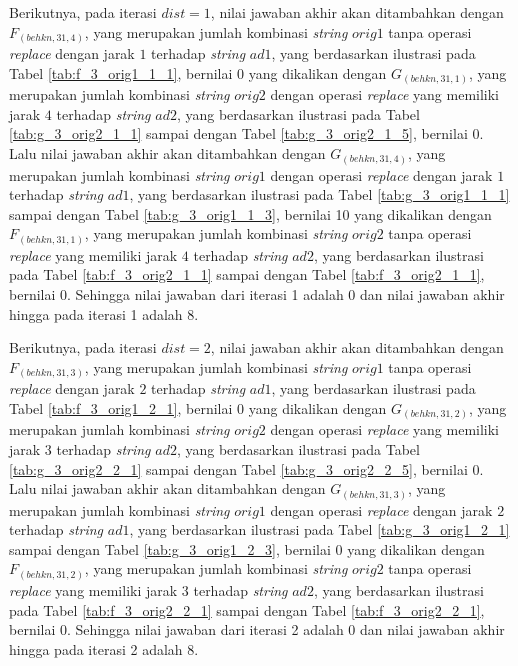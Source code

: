 Berikutnya, pada iterasi $ dist = 1 $, nilai jawaban akhir akan ditambahkan dengan $ F_{(behkn, 31,4)} $, yang merupakan jumlah kombinasi \textit{string} $ orig1 $ tanpa operasi \textit{replace} dengan jarak $ 1 $ terhadap \textit{string} $ ad1 $, yang berdasarkan ilustrasi pada Tabel \ref{tab:f_3_orig1_1_1}, bernilai 0 yang dikalikan dengan $ G_{(behkn, 31,1)} $, yang merupakan jumlah kombinasi \textit{string} $ orig2 $ dengan operasi \textit{replace} yang memiliki jarak $ 4 $ terhadap \textit{string} $ ad2 $, yang berdasarkan ilustrasi pada Tabel \ref{tab:g_3_orig2_1_1} sampai dengan Tabel \ref{tab:g_3_orig2_1_5}, bernilai 0. Lalu nilai jawaban akhir akan ditambahkan dengan $ G_{(behkn, 31,4)} $, yang merupakan jumlah kombinasi \textit{string} $ orig1 $ dengan operasi \textit{replace} dengan jarak $ 1 $ terhadap \textit{string} $ ad1 $, yang berdasarkan ilustrasi pada Tabel \ref{tab:g_3_orig1_1_1} sampai dengan Tabel \ref{tab:g_3_orig1_1_3}, bernilai 10 yang dikalikan dengan $ F_{(behkn, 31,1)} $, yang merupakan jumlah kombinasi \textit{string} $ orig2 $ tanpa operasi \textit{replace} yang memiliki jarak $ 4 $ terhadap \textit{string} $ ad2 $, yang berdasarkan ilustrasi pada Tabel \ref{tab:f_3_orig2_1_1} sampai dengan Tabel \ref{tab:f_3_orig2_1_1}, bernilai 0. Sehingga nilai jawaban dari iterasi 1 adalah 0 dan nilai jawaban akhir hingga pada iterasi 1 adalah 8.

Berikutnya, pada iterasi $ dist = 2 $, nilai jawaban akhir akan ditambahkan dengan $ F_{(behkn, 31,3)} $, yang merupakan jumlah kombinasi \textit{string} $ orig1 $ tanpa operasi \textit{replace} dengan jarak $ 2 $ terhadap \textit{string} $ ad1 $, yang berdasarkan ilustrasi pada Tabel \ref{tab:f_3_orig1_2_1}, bernilai 0 yang dikalikan dengan $ G_{(behkn, 31,2)} $, yang merupakan jumlah kombinasi \textit{string} $ orig2 $ dengan operasi \textit{replace} yang memiliki jarak $ 3 $ terhadap \textit{string} $ ad2 $, yang berdasarkan ilustrasi pada Tabel \ref{tab:g_3_orig2_2_1} sampai dengan Tabel \ref{tab:g_3_orig2_2_5}, bernilai 0. Lalu nilai jawaban akhir akan ditambahkan dengan $ G_{(behkn, 31,3)} $, yang merupakan jumlah kombinasi \textit{string} $ orig1 $ dengan operasi \textit{replace} dengan jarak $ 2 $ terhadap \textit{string} $ ad1 $, yang berdasarkan ilustrasi pada Tabel \ref{tab:g_3_orig1_2_1} sampai dengan Tabel \ref{tab:g_3_orig1_2_3}, bernilai 0 yang dikalikan dengan $ F_{(behkn, 31,2)} $, yang merupakan jumlah kombinasi \textit{string} $ orig2 $ tanpa operasi \textit{replace} yang memiliki jarak $ 3 $ terhadap \textit{string} $ ad2 $, yang berdasarkan ilustrasi pada Tabel \ref{tab:f_3_orig2_2_1} sampai dengan Tabel \ref{tab:f_3_orig2_2_1}, bernilai 0. Sehingga nilai jawaban dari iterasi 2 adalah 0 dan nilai jawaban akhir hingga pada iterasi 2 adalah 8.

